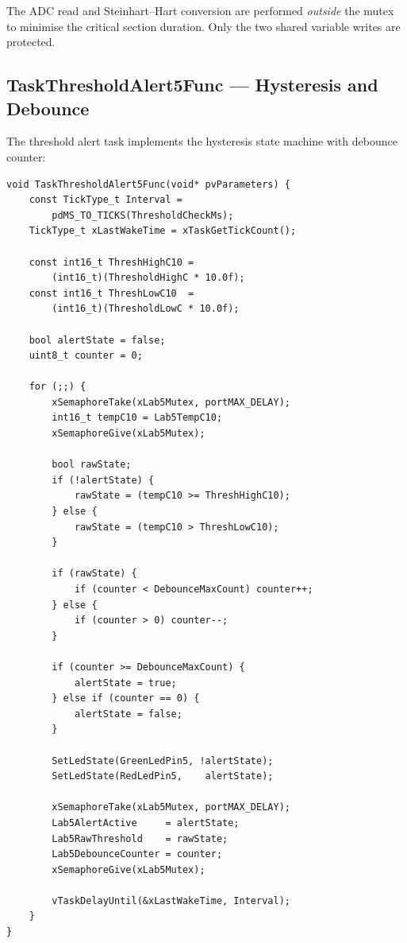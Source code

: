 \documentclass[12pt]{article}
\begin{document}
The ADC read and Steinhart--Hart conversion are performed \emph{outside} the mutex to minimise the critical section duration. Only the two shared variable writes are protected.

\subsection{TaskThresholdAlert5Func --- Hysteresis and Debounce}

The threshold alert task implements the hysteresis state machine with debounce counter:

\begin{lstlisting}[caption={TaskThresholdAlert5Func --- hysteresis + debounce}]
void TaskThresholdAlert5Func(void* pvParameters) {
    const TickType_t Interval =
        pdMS_TO_TICKS(ThresholdCheckMs);
    TickType_t xLastWakeTime = xTaskGetTickCount();

    const int16_t ThreshHighC10 =
        (int16_t)(ThresholdHighC * 10.0f);
    const int16_t ThreshLowC10  =
        (int16_t)(ThresholdLowC * 10.0f);

    bool alertState = false;
    uint8_t counter = 0;

    for (;;) {
        xSemaphoreTake(xLab5Mutex, portMAX_DELAY);
        int16_t tempC10 = Lab5TempC10;
        xSemaphoreGive(xLab5Mutex);

        bool rawState;
        if (!alertState) {
            rawState = (tempC10 >= ThreshHighC10);
        } else {
            rawState = (tempC10 > ThreshLowC10);
        }

        if (rawState) {
            if (counter < DebounceMaxCount) counter++;
        } else {
            if (counter > 0) counter--;
        }

        if (counter >= DebounceMaxCount) {
            alertState = true;
        } else if (counter == 0) {
            alertState = false;
        }

        SetLedState(GreenLedPin5, !alertState);
        SetLedState(RedLedPin5,    alertState);

        xSemaphoreTake(xLab5Mutex, portMAX_DELAY);
        Lab5AlertActive     = alertState;
        Lab5RawThreshold    = rawState;
        Lab5DebounceCounter = counter;
        xSemaphoreGive(xLab5Mutex);

        vTaskDelayUntil(&xLastWakeTime, Interval);
    }
}
\end{lstlisting}
\end{document}
